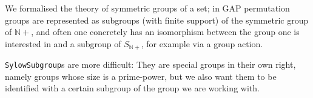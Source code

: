 We formalised the theory of symmetric groups of a set; in GAP permutation groups
are represented as subgroups (with finite support) of the symmetric group of
$\mathbb{N}+$, and often one concretely has an isomorphism between the group one
is interested in and a subgroup of $S_{\mathbb{N}+}$, for example
via a group action.

\texttt{SylowSubgroup}s are more difficult: They are special groups in their
own right, namely groups whose size is a prime-power, but we also want them
to be identified with a certain subgroup of the group we are working
with.


